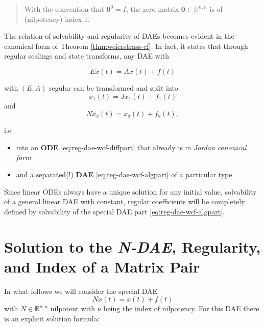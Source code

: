 \documentclass[]{book}
\providecommand{\tightlist}{%
  \setlength{\itemsep}{0pt}\setlength{\parskip}{0pt}}
\newenvironment {JHSAYS} [0] {\begin{quote}\color{jhsc}} {\end{quote}}
\theoremstyle{definition}
\theoremstyle{definition}
\theoremstyle{definition}
\theoremstyle{definition}
\theoremstyle{remark}
\begin{document}
\begin{JHSAYS}
With the convention that \(\mathbf 0^0=I\), the zero matrix
\(\mathbf 0 \in \mathbb R^{n,n}\) is of (nilpotency) index 1.
\end{JHSAYS}

The relation of solvability and regularity of DAEs becomes evident in the canonical form of Theorem \ref{thm:weierstrass-cf}. In fact, it states that through regular scalings and state transforms, any DAE with

\[
E\dot x(t) =  A x(t) + f(t)
\]

with \((E,A)\) regular can be transformed and split into
\begin{equation}
\dot x_1(t) = J x_1(t) + f_1(t) \label{eq:reg-dae-wcf-diffpart}
\end{equation}
and
\begin{equation}
N \dot x_2(t) = x_2(t) + f_2(t) \label{eq:reg-dae-wcf-algpart},
\end{equation}

i.e

\begin{itemize}
\tightlist
\item
  into an \textbf{ODE} \eqref{eq:reg-dae-wcf-diffpart} that already is in \emph{Jordan canonical form}
\item
  and a separated(!) \textbf{DAE} \eqref{eq:reg-dae-wcf-algpart} of a particular type.
\end{itemize}

Since linear ODEs always have a unique solution for any initial value, solvability of a general linear DAE with constant, regular coefficients will be completely defined by solvability of the special DAE part \eqref{eq:reg-dae-wcf-algpart}.

\hypertarget{solution-to-the-n-dae-regularity-and-index-of-a-matrix-pair}{%
\section{\texorpdfstring{Solution to the \emph{N-DAE}, Regularity, and Index of a Matrix Pair}{Solution to the N-DAE, Regularity, and Index of a Matrix Pair}}\label{solution-to-the-n-dae-regularity-and-index-of-a-matrix-pair}}

In what follows we will consider the special DAE
\begin{equation}
N \dot x(t) = x(t) + f(t) \label{eq:ndae}
\end{equation}
with \(N \in \mathbb R^{n,n}\) nilpotent with \(\nu\) being the \protect\hyperlink{def:nilpotent-matrix}{index of nilpotency}.
For this DAE there is an explicit solution formula:
\end{document}
